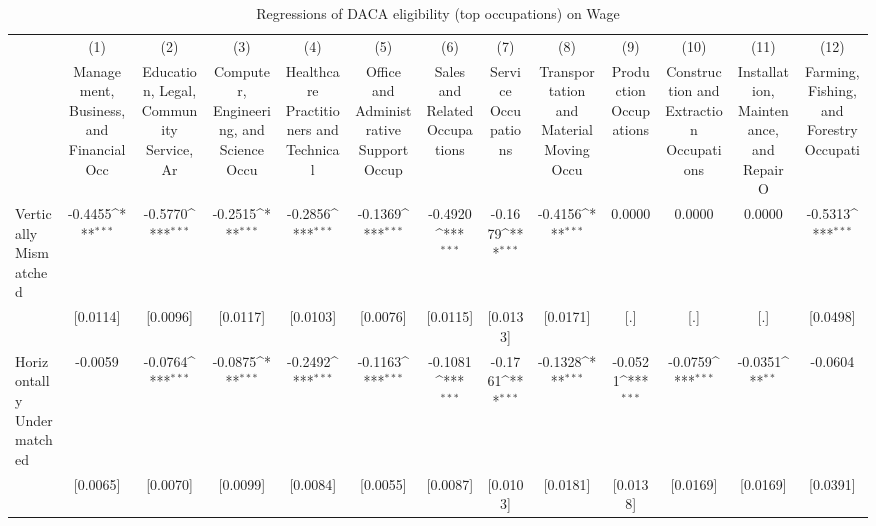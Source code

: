 \begin{table}[htbp]\centering
\def\sym#1{\ifmmode^{#1}\else\(^{#1}\)\fi}
\caption{Regressions of DACA eligibility (top occupations) on Wage}
\begin{tabular}{l*{12}{c}}
\toprule
                    &\multicolumn{1}{c}{(1)}         &\multicolumn{1}{c}{(2)}         &\multicolumn{1}{c}{(3)}         &\multicolumn{1}{c}{(4)}         &\multicolumn{1}{c}{(5)}         &\multicolumn{1}{c}{(6)}         &\multicolumn{1}{c}{(7)}         &\multicolumn{1}{c}{(8)}         &\multicolumn{1}{c}{(9)}         &\multicolumn{1}{c}{(10)}         &\multicolumn{1}{c}{(11)}         &\multicolumn{1}{c}{(12)}         \\
                    &Management, Business, and Financial Occ         &Education, Legal, Community Service, Ar         &Computer, Engineering, and Science Occu         &Healthcare Practitioners and Technical         &Office and Administrative Support Occup         &Sales and Related Occupations         &Service Occupations         &Transportation and Material Moving Occu         &Production Occupations         &Construction and Extraction Occupations         &Installation, Maintenance, and Repair O         &Farming, Fishing, and Forestry Occupati         \\
\midrule
Vertically Mismatched&     -0.4455\sym{***}&     -0.5770\sym{***}&     -0.2515\sym{***}&     -0.2856\sym{***}&     -0.1369\sym{***}&     -0.4920\sym{***}&     -0.1679\sym{***}&     -0.4156\sym{***}&      0.0000         &      0.0000         &      0.0000         &     -0.5313\sym{***}\\
                    &    [0.0114]         &    [0.0096]         &    [0.0117]         &    [0.0103]         &    [0.0076]         &    [0.0115]         &    [0.0133]         &    [0.0171]         &         [.]         &         [.]         &         [.]         &    [0.0498]         \\
\addlinespace
Horizontally Undermatched&     -0.0059         &     -0.0764\sym{***}&     -0.0875\sym{***}&     -0.2492\sym{***}&     -0.1163\sym{***}&     -0.1081\sym{***}&     -0.1761\sym{***}&     -0.1328\sym{***}&     -0.0521\sym{***}&     -0.0759\sym{***}&     -0.0351\sym{**} &     -0.0604         \\
                    &    [0.0065]         &    [0.0070]         &    [0.0099]         &    [0.0084]         &    [0.0055]         &    [0.0087]         &    [0.0103]         &    [0.0181]         &    [0.0138]         &    [0.0169]         &    [0.0169]         &    [0.0391]         \\

\end{tabular}
\end{table}
